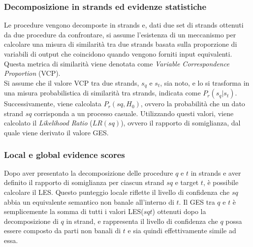\documentclass[12pt,a4paper,openright,twoside]{report}
\begin{document}
\subsubsection{Decomposizione in strands ed evidenze statistiche}

Le procedure vengono decomposte in strands e, dati due set di strands ottenuti da due procedure da confrontare, si assume l'esistenza di un meccanismo per calcolare una misura di similarità tra due strands basata sulla proporzione di variabili di output che coincidono quando vengono forniti input equivalenti. Questa metrica di similarità viene denotata come \textit{Variable Correspondence Proportion} (VCP).\\
Si assume che il valore VCP tra due strands, $s_q$ e $s_t$, sia noto, e lo si trasforma in una misura probabilistica di similarità tra strands, indicata come $P_r(s_q|s_t)$. Successivamente, viene calcolata $P_r(sq,H_0)$, ovvero la probabilità che un dato strand $sq$ corrisponda a un processo casuale. Utilizzando questi valori, viene calcolato il \textit{Likelihood Ratio} ($LR(sq)$), ovvero il rapporto di somiglianza, dal quale viene derivato il valore GES.

\subsubsection{Local e global evidence scores}

Dopo aver presentato la decomposizione delle procedure $q$ e $t$ in strands e aver definito il rapporto di somiglianza per ciascun strand $sq$ e target $t$, è possibile calcolare il LES. Questo punteggio locale riflette il livello di confidenza che $sq$ abbia un equivalente semantico non banale all'interno di $t$. Il GES tra $q$ e $t$ è semplicemente la somma di tutti i valori LES($sqt$) ottenuti dopo la decomposizione di $q$ in strand, e rappresenta il livello di confidenza che $q$ possa essere composto da parti non banali di $t$ e sia quindi effettivamente simile ad essa.
\end{document}
